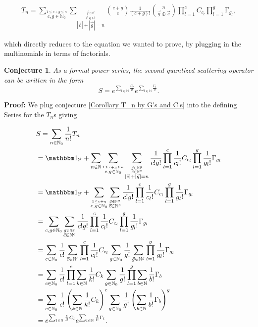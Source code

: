 \documentclass[b5paper,draft,openbib,12pt]{memoir}
\newtheorem{Conj}[Def]{Conjecture}
\newcommand{\id}{{\mathbbm 1}}
\begin{document}
\begin{multline}
T_n = \sum_{\stackrel{1\le c+g\le n}{c,g\in\mathbb{N}_0}}
\sum_{\stackrel{\stackrel{\vec{g}\in\mathbb{N}^g}{\vec{c}\in\mathbb{N}^c}}{|\vec{c}| + |\vec{g}|=n}} 
\binom{c+g}{c} \frac{1}{(c+g)!} \binom{n}{\vec{g}\oplus \vec{c}}
\prod_{l=1}^c  C_{c_l} \prod_{l=1}^g \mathrm\Gamma_{g_l},
\end{multline}

which directly reduces to the equation we wanted to prove, by plugging in the multinomials in terms of
factorials. 

\begin{Conj}
As a formal power series, the second quantized scattering operator can be written in the form
\begin{equation}\label{Corollary double exp}
S= e^{\sum_{l\in\mathbb{N}} \frac{C_{l}}{l!}}
 e^{\sum_{l\in\mathbb{N}} \frac{\mathrm\Gamma_{l}}{l!}}.
\end{equation}
\end{Conj}
\textbf{Proof:} We plug conjecture \ref{Corollary T_n by G's and C's} into the defining Series for the \(T_n\)s
giving

\begin{align}
&S= \sum_{n\in\mathbb{N}_0} \frac{1}{n!} T_n \\
&=\id_{\mathcal{F}}+ \sum_{n\in\mathbb{N}} \sum_{\stackrel{1\le c+g\le n}{c,g\in\mathbb{N}_0}} 
\sum_{\stackrel{\stackrel{\vec{g}\in\mathbb{N}^g}{\vec{c}\in\mathbb{N}^c}}{|\vec{c}| + |\vec{g}|=n}} 
\frac{1}{c! g!} \prod_{l=1}^c \frac{1}{c_l!} C_{c_l} \prod_{l=1}^g \frac{1}{g_l!} \mathrm\Gamma_{g_l}\\
&=\id_{\mathcal{F}}+  \sum_{\stackrel{1\le c+g }{c,g\in\mathbb{N}_0}} 
\sum_{\stackrel{\vec{g}\in\mathbb{N}^g}{\vec{c}\in\mathbb{N}^c}} 
\frac{1}{c! g!} \prod_{l=1}^c \frac{1}{c_l!} C_{c_l} \prod_{l=1}^g \frac{1}{g_l!} \mathrm\Gamma_{g_l}\\
&=\sum_{c,g\in\mathbb{N}_0}
\sum_{\stackrel{\vec{g}\in\mathbb{N}^g}{\vec{c}\in\mathbb{N}^c}} 
\frac{1}{c! g!} \prod_{l=1}^c \frac{1}{c_l!} C_{c_l} \prod_{l=1}^g \frac{1}{g_l!} \mathrm\Gamma_{g_l}\\
&=\sum_{c\in\mathbb{N}_0} \frac{1}{c!} \sum_{\vec{c}\in\mathbb{N}^c} \prod_{l=1}^c \frac{1}{c_l!} C_{c_l}
\sum_{g\in\mathbb{N}_0} \frac{1}{g!} \sum_{\vec{g}\in\mathbb{N}^g} \prod_{l=1}^g \frac{1}{g_l!} \mathrm\Gamma_{g_l}\\
&=\sum_{c\in\mathbb{N}_0} \frac{1}{c!} \prod_{l=1}^c \sum_{k\in\mathbb{N}} \frac{1}{k!} C_{k}
\sum_{g\in\mathbb{N}_0} \frac{1}{g!}  \prod_{l=1}^g \sum_{b\in\mathbb{N}} \frac{1}{b!} \mathrm\Gamma_{b}\\
&=\sum_{c\in\mathbb{N}_0} \frac{1}{c!} \left( \sum_{k\in\mathbb{N}} \frac{1}{k!} C_{k}\right)^c
\sum_{g\in\mathbb{N}_0} \frac{1}{g!}  \left( \sum_{b\in\mathbb{N}} \frac{1}{b!} \mathrm\Gamma_{b}\right)^g\\
&=e^{\sum_{l\in\mathbb{N}} \frac{1}{l!} C_{l}} e^{\sum_{l\in\mathbb{N}} \frac{1}{l!} \mathrm\Gamma_{l}}.
\end{align}
\end{document}
